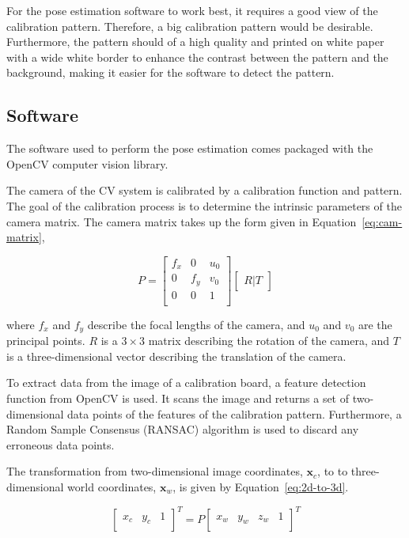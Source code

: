 For the pose estimation software to work best, it requires a good view of the calibration pattern. Therefore, a big calibration pattern would be desirable. Furthermore, the pattern should of a high quality and printed on white paper with a wide white border to enhance the contrast between the pattern and the background, making it easier for the software to detect the pattern. 

\subsection{Software}
\label{sec:cv-sys-software}

The software used to perform the pose estimation comes packaged with the OpenCV computer vision library. 

The camera of the CV system is calibrated by a calibration function and pattern. The goal of the calibration process is to determine the intrinsic parameters of the camera matrix. The camera matrix takes up the form given in Equation~\ref{eq:cam-matrix},

\begin{equation}
  \label{eq:cam-matrix}
  P = 
  \begin{bmatrix}
    f_x & 0   & u_0 \\
    0   & f_y & v_0 \\
    0   & 0   & 1   \\
  \end{bmatrix}
  \begin{bmatrix}
    R | T
  \end{bmatrix}
\end{equation}

where $f_x$ and $f_y$ describe the focal lengths of the camera, and $u_0$ and $v_0$ are the principal points. $R$ is a $3\times3$ matrix describing the rotation of the camera, and $T$ is a three-dimensional vector describing the translation of the camera. 

To extract data from the image of a calibration board, a feature detection function from OpenCV is used. It scans the image and returns a set of two-dimensional data points of the features of the calibration pattern. Furthermore, a Random Sample Consensus (RANSAC) algorithm is used to discard any erroneous data points.

The transformation from two-dimensional image coordinates, $\bm{x}_c$, to to three-dimensional world coordinates, $\bm{x}_w$, is given by Equation~\ref{eq:2d-to-3d}.

\begin{equation}
   \label{eq:2d-to-3d}
   \begin{bmatrix}
     x_c & y_c & 1 \\
   \end{bmatrix}^T
   = P
   \begin{bmatrix}
     x_w & y_w & z_w & 1 \\
   \end{bmatrix}^T
 \end{equation}

